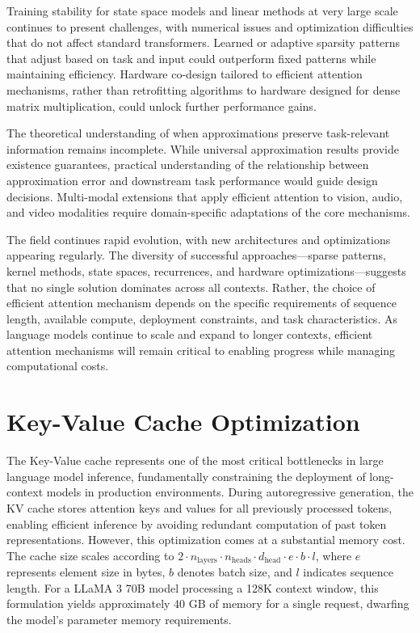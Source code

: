 \documentclass[11pt,letterpaper]{article}
\begin{document}
Training stability for state space models and linear methods at very large scale continues to present challenges, with numerical issues and optimization difficulties that do not affect standard transformers. Learned or adaptive sparsity patterns that adjust based on task and input could outperform fixed patterns while maintaining efficiency. Hardware co-design tailored to efficient attention mechanisms, rather than retrofitting algorithms to hardware designed for dense matrix multiplication, could unlock further performance gains.

The theoretical understanding of when approximations preserve task-relevant information remains incomplete. While universal approximation results provide existence guarantees, practical understanding of the relationship between approximation error and downstream task performance would guide design decisions. Multi-modal extensions that apply efficient attention to vision, audio, and video modalities require domain-specific adaptations of the core mechanisms.

The field continues rapid evolution, with new architectures and optimizations appearing regularly. The diversity of successful approaches—sparse patterns, kernel methods, state spaces, recurrences, and hardware optimizations—suggests that no single solution dominates across all contexts. Rather, the choice of efficient attention mechanism depends on the specific requirements of sequence length, available compute, deployment constraints, and task characteristics. As language models continue to scale and expand to longer contexts, efficient attention mechanisms will remain critical to enabling progress while managing computational costs.


\section{Key-Value Cache Optimization}
\label{sec:kvcache}

The Key-Value cache represents one of the most critical bottlenecks in large language model inference, fundamentally constraining the deployment of long-context models in production environments. During autoregressive generation, the KV cache stores attention keys and values for all previously processed tokens, enabling efficient inference by avoiding redundant computation of past token representations. However, this optimization comes at a substantial memory cost. The cache size scales according to $2 \cdot n_{\text{layers}} \cdot n_{\text{heads}} \cdot d_{\text{head}} \cdot e \cdot b \cdot l$, where $e$ represents element size in bytes, $b$ denotes batch size, and $l$ indicates sequence length. For a LLaMA 3 70B model processing a 128K context window, this formulation yields approximately 40 GB of memory for a single request, dwarfing the model's parameter memory requirements.
\end{document}
